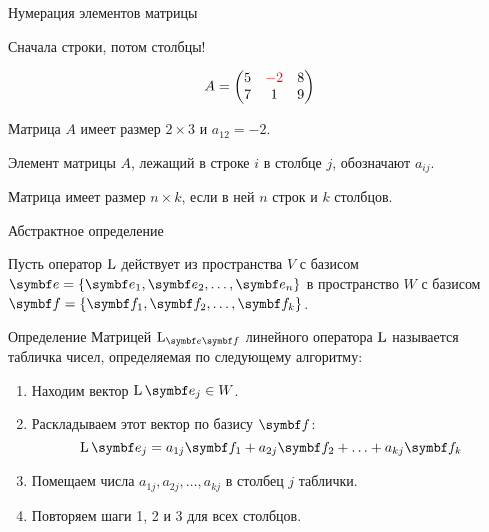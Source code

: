 \begin{frame}{Нумерация элементов матрицы}

\alert{Сначала строки, потом столбцы!}
\pause

\[
A = \begin{pmatrix} 
    5 & \textcolor{red}{-2} & 8 \\
    7 & 1 & 9 \\
\end{pmatrix}    
\]

Матрица $A$ имеет размер $2 \times 3$ и $a_{12} = -2$.

\pause
Элемент матрицы $A$, лежащий в строке $i$ в столбце $j$, 
обозначают $a_{ij}$.

Матрица имеет размер $n\times k$, если в ней $n$ строк
и $k$ столбцов.

\end{frame}



\begin{frame}{Абстрактное определение}



Пусть оператор $\operatorname{L}$ действует из пространства $V$ с базисом 
$\be = \{\be_1, \be_2, \ldots, \be_n\}$ в пространство $W$ с базисом
$\bff = \{\bff_1, \bff_2, \ldots, \bff_k\}$.

\pause
\begin{block}{Определение}
\alert{Матрицей} $\LL_{\be\bff}$ \alert{линейного оператора} $\operatorname{L}$ называется табличка
чисел, определяемая по следующему алгоритму:

\begin{enumerate}
     \item Находим вектор $\LL \be_j \in W$.
     \pause
    \item Раскладываем этот вектор по базису $\bff$:
     \[
         \LL \be_j = a_{1j} \bff_1 + a_{2j} \bff_2 + \ldots + a_{kj} \bff_k
     \]
     \pause
     \item Помещаем числа $a_{1j}, a_{2j}, \ldots, a_{kj}$ в столбец $j$ таблички.
     \pause
     \item Повторяем шаги 1, 2 и 3 для всех столбцов.
\end{enumerate}

\end{block}

\end{frame}
